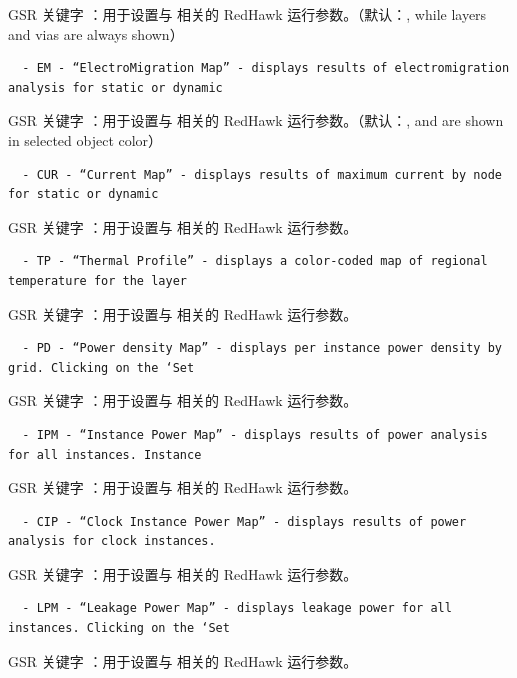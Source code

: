 GSR 关键字 ：用于设置与  相关的 RedHawk 运行参数。（默认：, while layers and vias are always shown）

\begin{lstlisting}
  - EM - “ElectroMigration Map” - displays results of electromigration analysis for static or dynamic
\end{lstlisting}

GSR 关键字 ：用于设置与  相关的 RedHawk 运行参数。（默认：, and are shown in selected object color）

\begin{lstlisting}
  - CUR - “Current Map” - displays results of maximum current by node for static or dynamic
\end{lstlisting}

GSR 关键字 ：用于设置与  相关的 RedHawk 运行参数。

\begin{lstlisting}
  - TP - “Thermal Profile” - displays a color-coded map of regional temperature for the layer
\end{lstlisting}

GSR 关键字 ：用于设置与  相关的 RedHawk 运行参数。

\begin{lstlisting}
  - PD - “Power density Map” - displays per instance power density by grid. Clicking on the ‘Set
\end{lstlisting}

GSR 关键字 ：用于设置与  相关的 RedHawk 运行参数。

\begin{lstlisting}
  - IPM - “Instance Power Map” - displays results of power analysis for all instances. Instance
\end{lstlisting}

GSR 关键字 ：用于设置与  相关的 RedHawk 运行参数。

\begin{lstlisting}
  - CIP - “Clock Instance Power Map” - displays results of power analysis for clock instances.
\end{lstlisting}

GSR 关键字 ：用于设置与  相关的 RedHawk 运行参数。

\begin{lstlisting}
  - LPM - “Leakage Power Map” - displays leakage power for all instances. Clicking on the ‘Set
\end{lstlisting}

GSR 关键字 ：用于设置与  相关的 RedHawk 运行参数。

